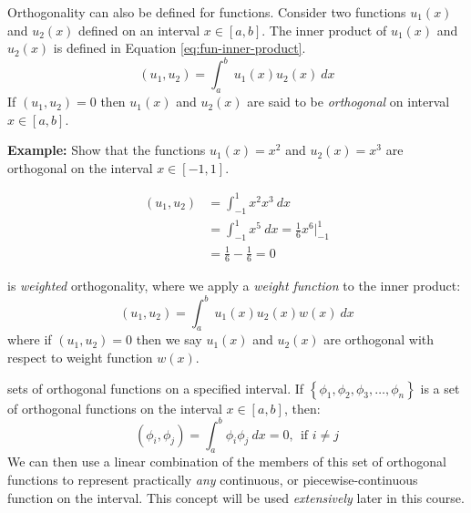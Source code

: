 Orthogonality can also be defined for functions. Consider two functions $u_1(x)$ and $u_2(x)$ defined on an interval $x\in[a,b]$.  The inner product of $u_1(x)$ and $u_2(x)$ is defined in Equation \ref{eq:fun-inner-product}.
\begin{equation}
\left(u_1,u_2\right) = \int_{a}^{b} \ u_1(x)u_2(x) \ dx
\label{eq:fun-inner-product}
\end{equation}
If $\left(u_1,u_2\right)=0$ then $u_1(x)$ and $u_2(x)$ are said to be \emph{orthogonal} on interval $x\in[a,b]$.

\vspace{0.5cm}

\noindent\textbf{Example:} Show that the functions $u_1(x)=x^2$ and $u_2(x)=x^3$ are orthogonal on the interval $x \in[-1,1]$.

\vspace{0.5cm}

\begin{align*}
\left(u_1,u_2\right) &= \int_{-1}^{1} x^2 x^3 \ dx \\
&= \int_{-1}^1 x^5 \ dx = \frac{1}{6}x^6\Bigr|_{-1}^{1} \\
&=\frac{1}{6} - \frac{1}{6} = 0
\end{align*}

 is \emph{weighted} orthogonality, where we apply a \emph{weight function} to the inner product:
\begin{equation}
\left(u_1,u_2\right) = \int_a^b \ u_1(x)u_2(x)w(x) \ dx
\label{eq:weighted-inner-product}
\end{equation}
where if $\left(u_1,u_2\right)=0$ then we say $u_1(x)$ and $u_2(x)$ are orthogonal with respect to weight function $w(x)$.

 sets of orthogonal functions on a specified interval.  If $\left\{ \phi_1,\phi_2,\phi_3,\dots,\phi_n\right\}$ is a set of orthogonal functions on the interval $x\in[a,b]$, then:
\begin{equation*}
\left(\phi_i, \phi_j\right) = \int_{a}^{b} \phi_i \phi_j \ dx = 0, \ \ \text{if } i \ne j
\end{equation*}
We can then use a linear combination of the members of this set of orthogonal functions to represent practically \emph{any} continuous, or piecewise-continuous function on the interval.  This concept will be used \emph{extensively} later in this course.

